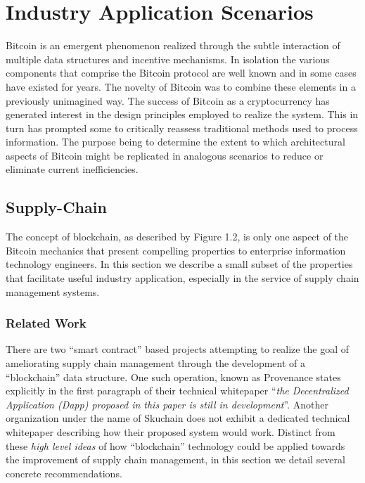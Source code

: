 \chapter{Industry Application Scenarios}

Bitcoin is an emergent phenomenon realized through the subtle interaction of multiple data structures and incentive mechanisms. 
In isolation the various components that comprise the Bitcoin protocol are well known and in some cases have existed for years.
The novelty of Bitcoin was to combine these elements in a previously unimagined way. 
The success of Bitcoin as a cryptocurrency has generated interest in the design principles employed to realize the system.
This in turn has prompted some to critically reassess traditional methods used to process information. 
The purpose being to determine the extent to which architectural aspects of Bitcoin might be replicated in analogous scenarios to reduce or eliminate current inefficiencies. 

\section{Supply-Chain} 

The concept of blockchain, as described by Figure 1.2, is only one aspect of the Bitcoin mechanics that present compelling properties to enterprise information technology engineers.
In this section we describe a small subset of the properties that facilitate useful industry application, especially in the service of supply chain management systems. 

\subsection*{Related Work} 

There are two ``smart contract'' based projects attempting to realize the goal of ameliorating supply chain management through the development of a ``blockchain'' data structure. 
One such operation, known as Provenance states explicitly in the first paragraph of their technical whitepaper ``\textit{the Decentralized Application (Dapp) proposed in this paper is still in development}''.
Another organization under the name of Skuchain does not exhibit a dedicated technical whitepaper describing how their proposed system would work. 
Distinct from these \textit{high level ideas} of how ``blockchain'' technology could be applied towards the improvement of supply chain management, in this section we detail several concrete recommendations. 

